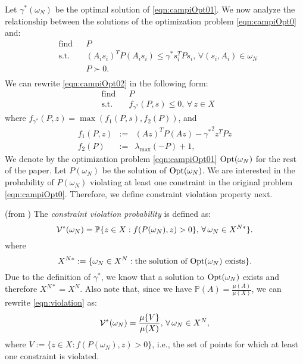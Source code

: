 Let $\gamma^*(\omega_N)$ be the optimal solution of \eqref{eqn:campiOpt01}. We now analyze the relationship between the solutions of the optimization problem \eqref{eqn:campiOpt0} and:
\begin{equation}\label{eqn:campiOpt02}
\begin{aligned}
& \text{find} & & P \\
& \text{s.t.} 
&  & (A_is_i)^TP(A_is_i) \leq \gamma^* s_i^TPs_i,\,\forall (s_i,A_i) \in \omega_N \\
& && P \succ 0. \\
\end{aligned}
\end{equation}
We can rewrite \eqref{eqn:campiOpt02} in the following form:
\begin{equation}
\label{eqn:campiOpt2}
\begin{aligned}
& \text{find} & & P \\
& \text{s.t.} 
& & f_{\gamma^*}(P, s) \leq 0,\,\forall\, z \in X \end{aligned}
\end{equation}
where $f_{\gamma^*}(P, z) = \max(f_1(P, s), f_2(P))$, and 
\begin{eqnarray*}
f_1(P, z) &:=& (Az)^TP(Az) - {\gamma^*}^2 z^TPz \\
f_2(P) &:=& \lambda_{\max}(-P) +1,
\end{eqnarray*}
We denote by the optimization problem \eqref{eqn:campiOpt01} $\text{Opt}(\omega_N)$ for the rest of the paper. Let $P(\omega_N)$ be the solution of $\text{Opt}(\omega_N)$. We are interested in the probability of $P(\omega_N)$ violating at least one constraint in the original problem \eqref{eqn:campiOpt0}. Therefore, we define constraint violation property next.

\begin{definition}(from \cite{campi}) The \emph{constraint violation probability} is defined as:
\begin{equation}\label{eqn:violation}
\mathcal{V}^*(\omega_N)=
      \mathbb{P}\{z \in X: f(P(\omega_N), z) > 0\},\, \forall\, \omega_N \in X^{N*}\}.
\end{equation}
where $$X^{N*}:=\{\omega_N \in X^N: \text{the solution of $\text{Opt}(\omega_N)$ exists}\}.$$ 
Due to the definition of $\gamma^*$, we know that a solution to $\text{Opt}(\omega_N)$ exists and therefore $X^{N*} = X^N$. Also note that, since we have $\mathbb{P}(A) = \frac{\mu(A)}{\mu(X)}$, we can rewrite \eqref{eqn:violation} as:
\begin{equation*}
\mathcal{V}^*(\omega_N)=
      \frac{\mu\{V\}}{\mu(X)},\, \forall\, \omega_N \in X^N,
\end{equation*}
where $V:=\{z \in X: f(P(\omega_N), z) > 0\}$, i.e., the set of points for which at least one constraint is violated.
\end{definition}


